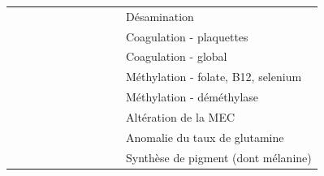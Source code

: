 \begin{table}[hb]
{\begin{tabular}{@{}lllllllllll@{}}
                         &                                     &                          &                          & \cellcolor[HTML]{F8A102} & \cellcolor[HTML]{F8A102} & \cellcolor[HTML]{F8A102} &                            &                          &                          & Désamination                              \\
\cellcolor[HTML]{F8A102} & \cellcolor[HTML]{F8A102}            &                          &                          &                          &                          & \cellcolor[HTML]{F8A102} &                            &                          &                          & Coagulation - plaquettes                  \\
\cellcolor[HTML]{F8A102} & \cellcolor[HTML]{F8A102}            & \cellcolor[HTML]{F8A102} &                          &                          &                          & \cellcolor[HTML]{F8A102} &                            &                          &                          & Coagulation - global                      \\
\cellcolor[HTML]{F8A102} & \cellcolor[HTML]{F8A102}            &                          & \cellcolor[HTML]{F8A102} &                          &                          &                          &                            &                          &                          & Méthylation - folate, B12, selenium       \\
                         &                                     &                          & \cellcolor[HTML]{F8A102} & \cellcolor[HTML]{F8A102} &                          &                          &                            & \cellcolor[HTML]{F8A102} &                          & Méthylation - déméthylase                 \\
\cellcolor[HTML]{F8A102} & \cellcolor[HTML]{F8A102}            &                          & \cellcolor[HTML]{F8A102} &                          &                          &                          &                            &                          & \cellcolor[HTML]{F8A102} & Altération de la MEC                      \\
                         &                                     & \cellcolor[HTML]{F8A102} &                          & \cellcolor[HTML]{F8A102} & \cellcolor[HTML]{F8A102} &                          &                            &                          &                          & Anomalie du taux de glutamine             \\
\cellcolor[HTML]{F8A102} &                                     &                          &                          & \cellcolor[HTML]{F8A102} &                          &                          & \cellcolor[HTML]{F8A102}   &                          &                          & Synthèse de pigment (dont mélanine)      \\

\end{tabular}}
\end{table}
